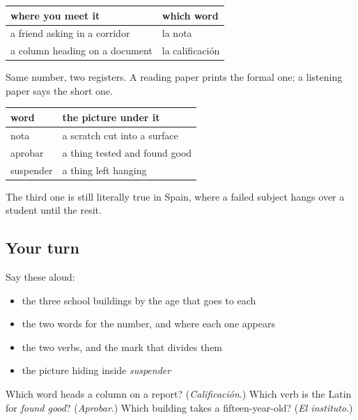 \begin{grammarlens}[title={Grammar Lens: two words for one number}]
\noindent
\begin{tabularx}{\linewidth}{@{}>{\raggedright\arraybackslash}X>{\raggedright\arraybackslash}X@{}}
\toprule
\textbf{where you meet it} & \textbf{which word} \\
\midrule
a friend asking in a corridor & la nota \\
a column heading on a document & la calificación \\
\bottomrule
\end{tabularx}

Same number, two registers. A reading paper prints the formal one; a listening paper says the short one.
\end{grammarlens}

\begin{grammarlens}[title={Grammar Lens: three Latin pictures}]
\noindent
\begin{tabularx}{\linewidth}{@{}>{\raggedright\arraybackslash}X>{\raggedright\arraybackslash}X@{}}
\toprule
\textbf{word} & \textbf{the picture under it} \\
\midrule
nota & a scratch cut into a surface \\
aprobar & a thing tested and found good \\
suspender & a thing left hanging \\
\bottomrule
\end{tabularx}

The third one is still literally true in Spain, where a failed subject hangs over a student until the resit.
\end{grammarlens}

\subsection*{Your turn}
Say these aloud:

\begin{itemize}
\raggedright
  \item the three school buildings by the age that goes to each
  \item the two words for the number, and where each one appears
  \item the two verbs, and the mark that divides them
  \item the picture hiding inside \emph{suspender}
\end{itemize}

\begin{tcolorbox}[breakable,colback=teal!4,colframe=teal!35!black,title={Before you move on}]
Which word heads a column on a report? (\emph{Calificación}.) Which verb is the Latin for \emph{found good}? (\emph{Aprobar}.) Which building takes a fifteen-year-old? (\emph{El instituto}.)
\end{tcolorbox}
